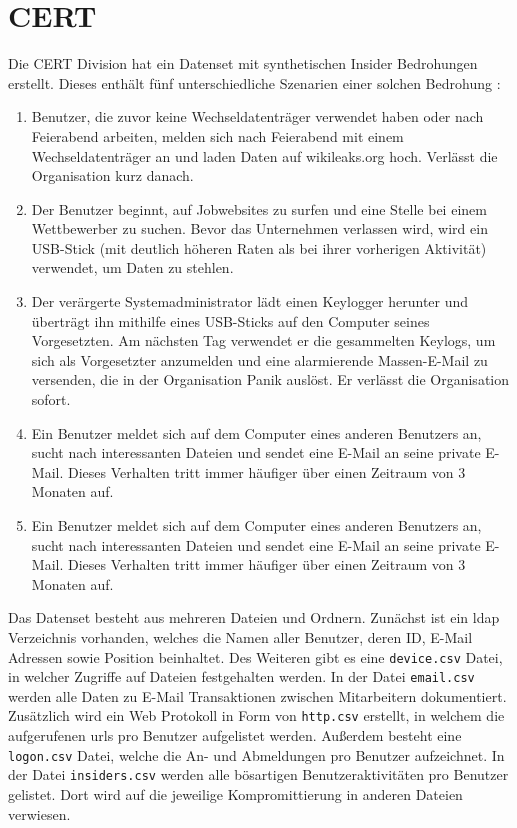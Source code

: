 \documentclass[
    12pt, %
    DIV10,
    ngerman, %
    a4paper, %
    oneside, %
    titlepage, %
    parskip=half, %
    headings=normal, %
    listof=totoc, %
    bibliography=totoc, %
    index=totoc, %
    captions=tableheading, %
    final %
]{scrreprt}
\begin{document}
\section{CERT}
Die CERT Division hat ein Datenset mit synthetischen Insider Bedrohungen erstellt. Dieses enthält fünf unterschiedliche Szenarien einer solchen Bedrohung \parencite{glasser2013bridging}:
\begin{enumerate}
\item Benutzer, die zuvor keine Wechseldatenträger verwendet haben oder nach Feierabend arbeiten, melden sich nach Feierabend mit einem Wechseldatenträger an und laden Daten auf wikileaks.org hoch. Verlässt die Organisation kurz danach.
\item Der Benutzer beginnt, auf Jobwebsites zu surfen und eine Stelle bei einem Wettbewerber zu suchen. Bevor das Unternehmen verlassen wird, wird ein USB-Stick (mit deutlich höheren Raten als bei ihrer vorherigen Aktivität) verwendet, um Daten zu stehlen.
\item Der verärgerte Systemadministrator lädt einen Keylogger herunter und überträgt ihn mithilfe eines USB-Sticks auf den Computer seines Vorgesetzten. Am nächsten Tag verwendet er die gesammelten Keylogs, um sich als Vorgesetzter anzumelden und eine alarmierende Massen-E-Mail zu versenden, die in der Organisation Panik auslöst. Er verlässt die Organisation sofort.
\item Ein Benutzer meldet sich auf dem Computer eines anderen Benutzers an, sucht nach interessanten Dateien und sendet eine E-Mail an seine private E-Mail. Dieses Verhalten tritt immer häufiger über einen Zeitraum von 3 Monaten auf.
\item Ein Benutzer meldet sich auf dem Computer eines anderen Benutzers an, sucht nach interessanten Dateien und sendet eine E-Mail an seine private E-Mail. Dieses Verhalten tritt immer häufiger über einen Zeitraum von 3 Monaten auf.
\end{enumerate}
Das Datenset besteht aus mehreren Dateien und Ordnern. Zunächst ist ein \ac{ldap} Verzeichnis vorhanden, welches die Namen aller Benutzer, deren ID, E-Mail Adressen sowie Position beinhaltet. Des Weiteren gibt es eine \texttt{device.csv} Datei, in welcher Zugriffe auf Dateien festgehalten werden. In der Datei \texttt{email.csv} werden alle Daten zu E-Mail Transaktionen zwischen Mitarbeitern dokumentiert. Zusätzlich wird ein Web Protokoll in Form von \texttt{http.csv} erstellt, in welchem die aufgerufenen \ac{urls} pro Benutzer aufgelistet werden. Au{\ss}erdem besteht eine \texttt{logon.csv} Datei, welche die An- und Abmeldungen pro Benutzer aufzeichnet. In der Datei \texttt{insiders.csv} werden alle bösartigen Benutzeraktivitäten pro Benutzer gelistet. Dort wird auf die jeweilige Kompromittierung in anderen Dateien verwiesen.
\end{document}
